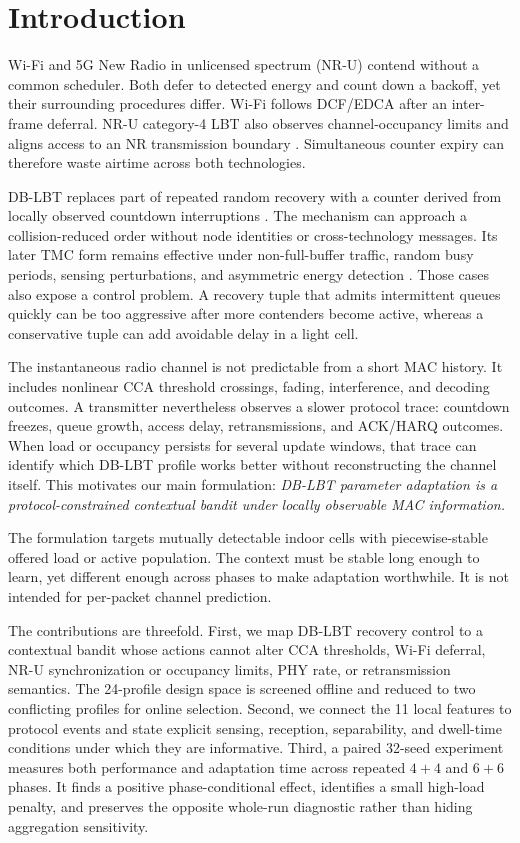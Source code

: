 \section{Introduction}
\label{sec:introduction}

Wi-Fi and 5G New Radio in unlicensed spectrum (NR-U) contend without a common
scheduler. Both defer to detected energy and count down a backoff, yet their
surrounding procedures differ. Wi-Fi follows DCF/EDCA after an inter-frame
deferral. NR-U category-4 LBT also observes channel-occupancy limits and aligns
access to an NR transmission boundary
\cite{ieee80211_2020,3gpp37213,naik2020next}. Simultaneous counter expiry can
therefore waste airtime across both technologies.

DB-LBT replaces part of repeated random recovery with a counter derived from
locally observed countdown interruptions \cite{kosek2022dblbt}. The mechanism
can approach a collision-reduced order without node identities or
cross-technology messages. Its later TMC form remains effective under
non-full-buffer traffic, random busy periods, sensing perturbations, and
asymmetric energy detection \cite{tinnirello2026deterministic}. Those cases
also expose a control problem. A recovery tuple that admits intermittent
queues quickly can be too aggressive after more contenders become active,
whereas a conservative tuple can add avoidable delay in a light cell.

The instantaneous radio channel is not predictable from a short MAC history.
It includes nonlinear CCA threshold crossings, fading, interference, and
decoding outcomes. A transmitter nevertheless observes a slower protocol
trace: countdown freezes, queue growth, access delay, retransmissions, and
ACK/HARQ outcomes. When load or occupancy persists for several update windows,
that trace can identify which DB-LBT profile works better without reconstructing
the channel itself. This motivates our main formulation:
\emph{DB-LBT parameter adaptation is a protocol-constrained contextual bandit
under locally observable MAC information.}

The formulation targets mutually detectable indoor cells with piecewise-stable
offered load or active population. The context must be stable long enough to
learn, yet different enough across phases to make adaptation worthwhile. It is
not intended for per-packet channel prediction.

The contributions are threefold. First, we map DB-LBT recovery control to a
contextual bandit whose actions cannot alter CCA thresholds, Wi-Fi deferral,
NR-U synchronization or occupancy limits, PHY rate, or retransmission
semantics. The 24-profile design space is screened offline and reduced to two
conflicting profiles for online selection. Second, we connect the 11 local
features to protocol events and state explicit sensing, reception,
separability, and dwell-time conditions under which they are informative.
Third, a paired 32-seed experiment measures both performance and adaptation
time across repeated $4+4$ and $6+6$ phases. It finds a positive
phase-conditional effect, identifies a small high-load penalty, and preserves
the opposite whole-run diagnostic rather than hiding aggregation sensitivity.
